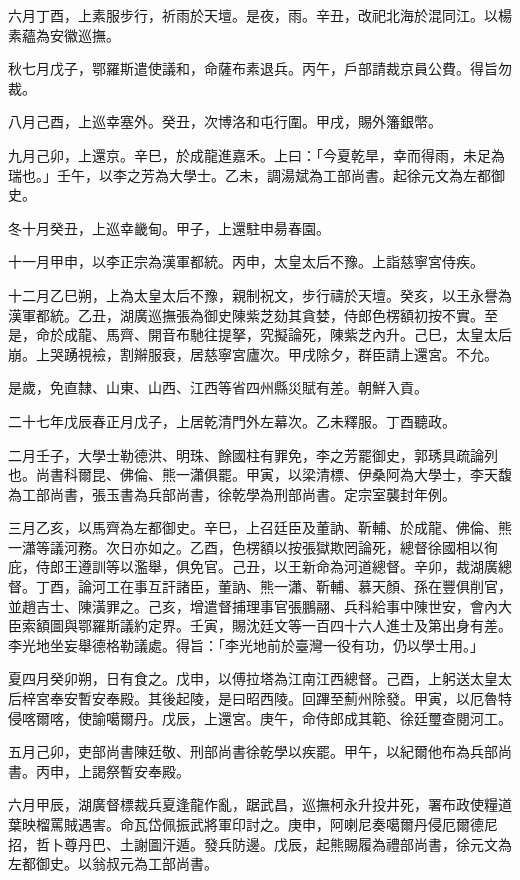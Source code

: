 \begin{pinyinscope}
六月丁酉，上素服步行，祈雨於天壇。是夜，雨。辛丑，改祀北海於混同江。以楊素蘊為安徽巡撫。

秋七月戊子，鄂羅斯遣使議和，命薩布素退兵。丙午，戶部請裁京員公費。得旨勿裁。

八月己酉，上巡幸塞外。癸丑，次博洛和屯行圍。甲戌，賜外籓銀幣。

九月己卯，上還京。辛巳，於成龍進嘉禾。上曰：「今夏乾旱，幸而得雨，未足為瑞也。」壬午，以李之芳為大學士。乙未，調湯斌為工部尚書。起徐元文為左都御史。

冬十月癸丑，上巡幸畿甸。甲子，上還駐申昜春園。

十一月甲申，以李正宗為漢軍都統。丙申，太皇太后不豫。上詣慈寧宮侍疾。

十二月乙巳朔，上為太皇太后不豫，親制祝文，步行禱於天壇。癸亥，以王永譽為漢軍都統。乙丑，湖廣巡撫張為御史陳紫芝劾其貪婪，侍郎色楞額初按不實。至是，命於成龍、馬齊、開音布馳往提拏，究擬論死，陳紫芝內升。己巳，太皇太后崩。上哭踴視襝，割辮服衰，居慈寧宮廬次。甲戌除夕，群臣請上還宮。不允。

是歲，免直隸、山東、山西、江西等省四州縣災賦有差。朝鮮入貢。

二十七年戊辰春正月戊子，上居乾清門外左幕次。乙未釋服。丁酉聽政。

二月壬子，大學士勒德洪、明珠、餘國柱有罪免，李之芳罷御史，郭琇具疏論列也。尚書科爾昆、佛倫、熊一瀟俱罷。甲寅，以梁清標、伊桑阿為大學士，李天馥為工部尚書，張玉書為兵部尚書，徐乾學為刑部尚書。定宗室襲封年例。

三月乙亥，以馬齊為左都御史。辛巳，上召廷臣及董訥、靳輔、於成龍、佛倫、熊一瀟等議河務。次日亦如之。乙酉，色楞額以按張獄欺罔論死，總督徐國相以徇庇，侍郎王遵訓等以濫舉，俱免官。己丑，以王新命為河道總督。辛卯，裁湖廣總督。丁酉，論河工在事互訐諸臣，董訥、熊一瀟、靳輔、慕天顏、孫在豐俱削官，並趙吉士、陳潢罪之。己亥，增遣督捕理事官張鵬翮、兵科給事中陳世安，會內大臣索額圖與鄂羅斯議約定界。壬寅，賜沈廷文等一百四十六人進士及第出身有差。李光地坐妄舉德格勒議處。得旨：「李光地前於臺灣一役有功，仍以學士用。」

夏四月癸卯朔，日有食之。戊申，以傅拉塔為江南江西總督。己酉，上躬送太皇太后梓宮奉安暫安奉殿。其後起陵，是曰昭西陵。回蹕至薊州除發。甲寅，以厄魯特侵喀爾喀，使諭噶爾丹。戊辰，上還宮。庚午，命侍郎成其範、徐廷璽查閱河工。

五月己卯，吏部尚書陳廷敬、刑部尚書徐乾學以疾罷。甲午，以紀爾他布為兵部尚書。丙申，上謁祭暫安奉殿。

六月甲辰，湖廣督標裁兵夏逢龍作亂，踞武昌，巡撫柯永升投井死，署布政使糧道葉映榴罵賊遇害。命瓦岱佩振武將軍印討之。庚申，阿喇尼奏噶爾丹侵厄爾德尼招，哲卜尊丹巴、土謝圖汗遁。發兵防邊。戊辰，起熊賜履為禮部尚書，徐元文為左都御史。以翁叔元為工部尚書。


\end{pinyinscope}
